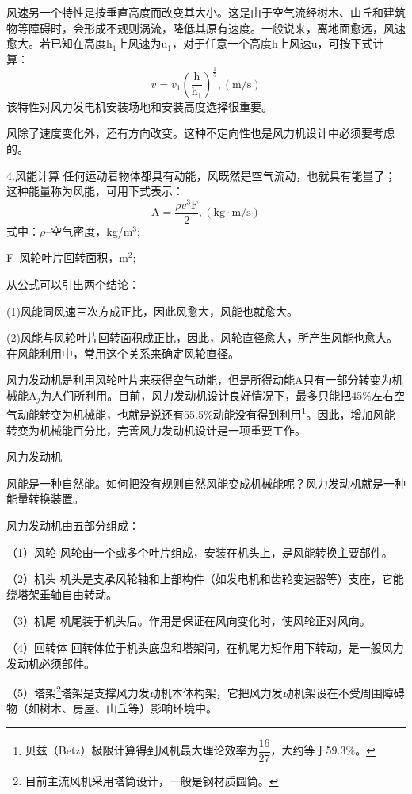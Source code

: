 \documentclass{ctexbook}
\begin{document}
风速另一个特性是按垂直高度而改变其大小。这是由于空气流经树木、山丘和建筑物等障碍时，会形成不规则涡流，降低其原有速度。一般说来，离地面愈远，风速愈大。若已知在高度h$_1$上风速为u$_1$，对于任意一个高度h上风速u，可按下式计算：
\begin{equation*}
	v=v_{1}(\frac{\text{h}}{\text{h}_{1}})^{\frac{1}{5}} , (\text{m/s})
\end{equation*}
该特性对风力发电机安装场地和安装高度选择很重要。

风除了速度变化外，还有方向改变。这种不定向性也是风力机设计中必须要考虑的。

4.风能计算 任何运动着物体都具有动能，风既然是空气流动，也就具有能量了；这种能量称为风能，可用下式表示：
\begin{equation*}
	\text{A}=\frac{\rho v^{3}\text{F}}{2} ,(\text{kg}\cdot \text{m/s})
\end{equation*}
式中：$\rho$--空气密度，kg/m$^{3}$;

F--风轮叶片回转面积，m$^{2}$;

从公式可以引出两个结论：

(1)风能同风速三次方成正比，因此风愈大，风能也就愈大。

(2)风能与风轮叶片回转面积成正比，因此，风轮直径愈大，所产生风能也愈大。在风能利用中，常用这个关系来确定风轮直径。

风力发动机是利用风轮叶片来获得空气动能，但是所得动能A只有一部分转变为机械能A$_j$为人们所利用。目前，风力发动机设计良好情况下，最多只能把45\%左右空气动能转变为机械能，也就是说还有55.5\%动能没有得到利用\footnote{贝兹（Betz）极限计算得到风机最大理论效率为$\dfrac{16}{27}$，大约等于59.3\%。}。因此，增加风能转变为机械能百分比，完善风力发动机设计是一项重要工作。

风力发动机

风能是一种自然能。如何把没有规则自然风能变成机械能呢？风力发动机就是一种能量转换装置。

风力发动机由五部分组成：

（1）风轮 风轮由一个或多个叶片组成，安装在机头上，是风能转换主要部件。

（2）机头 机头是支承风轮轴和上部构件（如发电机和齿轮变速器等）支座，它能绕塔架垂轴自由转动。

（3）机尾 机尾装于机头后。作用是保证在风向变化时，使风轮正对风向。

（4）回转体 回转体位于机头底盘和塔架间，在机尾力矩作用下转动，是一般风力发动机必须部件。

（5）塔架\footnote{目前主流风机采用塔筒设计，一般是钢材质圆筒。}塔架是支撑风力发动机本体构架，它把风力发动机架设在不受周围障碍物（如树木、房屋、山丘等）影响环境中。
\end{document}
